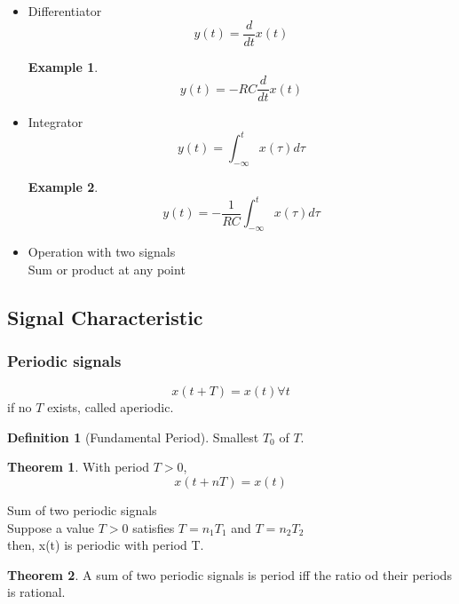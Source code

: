 \documentclass{article}
\theoremstyle{definition}
\newtheorem{definition}{Definition}[subsection]
\newtheorem{theorem}{Theorem}[subsection]
\newtheorem{example}{Example}[section]
\begin{document}
\begin{itemize}
    \item Differentiator
        \begin{equation}
            y(t)=\frac{d}{dt} x(t)
        \end{equation}
        \begin{example}
            \begin{equation}    
                y(t)=-RC \frac{d}{dt}x(t)
            \end{equation}
        \end{example}
    \item Integrator
        \begin{equation}
            y(t)=\int_{-\infty}^t x(\tau)d\tau
        \end{equation}
        \begin{example}
            \begin{equation}    
                y(t)=-\frac{1}{RC} \int_{-\infty}^t x(\tau)d\tau
            \end{equation}
        \end{example}
    \item Operation with two signals\\
        Sum or product at any point
\end{itemize}

\subsection{Signal Characteristic}
\subsubsection{Periodic signals}
\begin{equation}
    x(t+T)=x(t)\forall t
\end{equation}
if no $ T $ exists, called aperiodic.
\begin{definition}[Fundamental Period]
    Smallest $ T_0 $ of $ T $.
\end{definition}
\begin{theorem}
    With period $ T>0 $,
    \begin{equation}
        x(t+nT) = x(t)
    \end{equation}
\end{theorem}

Sum of two periodic signals\\
Suppose a value $ T>0 $ satisfies $ T=n_1T_1 $ and $ T=n_2T_2 $\\
then, x(t) is periodic with period T.
\begin{theorem}
    A sum of two periodic signals is period iff the ratio od their periods is rational.
\end{theorem}
\end{document}
